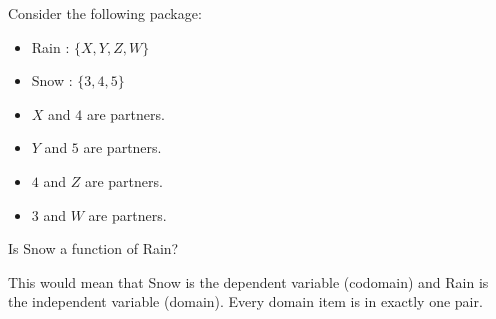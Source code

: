 \documentclass{ximera}
\begin{document}
\begin{question}
Consider the following package:
\begin{itemize}
\item Rain : $\{ X, Y, Z, W \}$
\item Snow : $\{ 3, 4, 5 \}$
\item $X$ and $4$ are partners.
\item $Y$ and $5$ are partners.
\item $4$ and $Z$ are partners.
\item $3$ and $W$ are partners.
\end{itemize}


Is Snow a function of Rain?

\begin{multipleChoice}
\end{multipleChoice}
\begin{feedback}
This would mean that Snow is the dependent variable (codomain) and Rain is the independent variable (domain). Every domain item is in exactly one pair.
\end{feedback}

\end{question}
\end{document}
